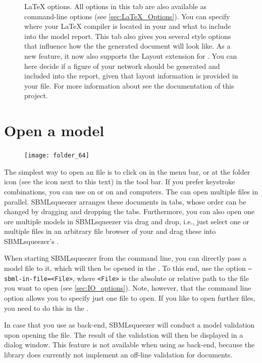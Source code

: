 \begin{figure}
\caption[\LaTeX{} options]{\LaTeX{} options.
All options in this tab are also available as command-line options
(see \vref{sec:LaTeX_Options}).
You can specify where your \LaTeX{} compiler is located in your \OS and what
to include into the model report.
This tab also gives you several style options that influence how the
the generated document will look like.
As a new feature, it now also supports the Layout extension for \SBML
\citep{Gauges2006}.
You can here decide if a figure of your network should be generated and
included into the report, given that layout information is provided in your file.
For more information about \SBMLLaTeX see the documentation of this project.}%
\label{fig:LaTeX_Options}
\end{figure}


\section{Open a model}

\begin{figure}
\vspace{\wrapfigspace}
\texttt{[image: folder\_64]}
\end{figure}
The simplest way to open an \SBML file is to click on  in the
menu bar, or at the folder icon (see the icon next to this text) in the tool bar.
If you prefer keystroke combinations, you can use  on \MacOSX or
 on \Windows and \Linux computers.
The \GUI can open multiple \SBML files in parallel.
SBMLsqueezer arranges these \SBML documents in tabs, whose order can be changed by dragging and dropping the tabs.
Furthermore, you can also open one ore multiple models in SBMLsqueezer via drag and drop, i.e., just select one or multiple \SBML files in an arbitrary file browser of your \OS and drag these into SBMLsqueezer's \GUI.

When starting SBMLsqueezer from the command line, you can directly pass a model
file to it, which will then be opened in the \GUI. To this
end, use the option \texttt{--sbml-in-file=<File>}, where \texttt{<File>} is the
absolute or relative path to the \SBML file you want to open (see
\vref{sec:IO_options}).
Note, however, that the command line option allows you to specify just one file
to open.
If you like to open further files, you need to do this in the \GUI.

In case that you use \libSBML as \SBML back-end, SBMLsqueezer will conduct a model validation upon opening the file.
The result of the validation will then be displayed in a dialog window.
This feature is not available when using \JSBML as \SBML back-end, because the \JSBML library does currently not implement an off-line validation for \SBML documents.

